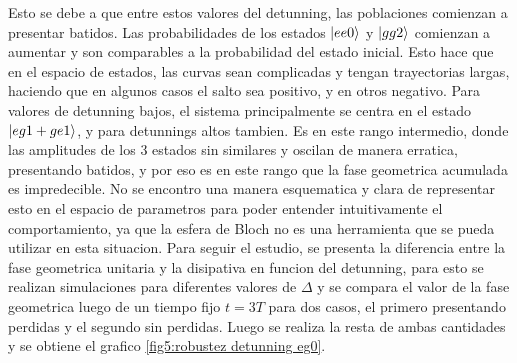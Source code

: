 Esto se debe a que entre estos valores del detunning, las poblaciones comienzan a presentar batidos. Las probabilidades de los estados $\ket{ee0}$ y $\ket{gg2}$ comienzan a aumentar y son comparables a la probabilidad del estado inicial. Esto hace que en el espacio de estados, las curvas sean complicadas y tengan trayectorias largas, haciendo que en algunos casos el salto sea positivo, y en otros negativo. Para valores de detunning bajos, el sistema principalmente se centra en el estado $\ket{eg1+ge1}$, y para detunnings altos tambien. Es en este rango intermedio, donde las amplitudes de los 3 estados sin similares y oscilan de manera erratica, presentando batidos, y por eso es en este rango que la fase geometrica acumulada es impredecible. 
No se encontro una manera esquematica y clara de representar esto en el espacio de parametros para poder entender intuitivamente el comportamiento, ya que la esfera de Bloch no es una herramienta que se pueda utilizar en esta situacion. 
Para seguir el estudio, se presenta la diferencia entre la fase geometrica unitaria y la disipativa en funcion del detunning, para esto se realizan simulaciones para diferentes valores de $\Delta$ y se compara el valor de la fase geometrica luego de un tiempo fijo $t=3T$ para dos casos, el primero presentando perdidas y el segundo sin perdidas. Luego se realiza la resta de ambas cantidades y se obtiene el grafico \ref{fig5:robustez detunning eg0}.

